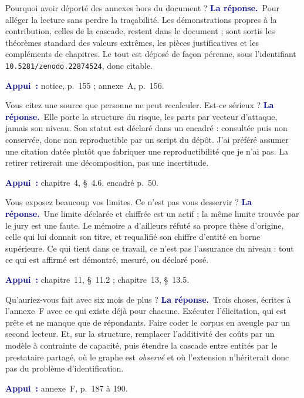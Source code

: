 \documentclass[11pt,a4paper]{article}
\newcommand{\rep}[1]{\smallskip\noindent\textcolor{navy}{\textbf{La réponse.}}\ #1\par}
\newcommand{\appui}[1]{\smallskip\noindent\small\textcolor{navy}{\textbf{Appui~:}} #1\par\normalsize}
\begin{document}
\begin{question}{\og Pourquoi avoir déporté des annexes hors du document ?\fg{}}
\rep{Pour alléger la lecture sans perdre la traçabilité. Les démonstrations propres à la
contribution, celles de la cascade, restent dans le document ; sont sortis les théorèmes standard
des valeurs extrêmes, les pièces justificatives et les compléments de chapitres. Le tout est déposé
de façon pérenne, sous l'identifiant \texttt{10.5281/zenodo.22874524}, donc citable.}
\appui{notice, p.~155 ; annexe~A, p.~156.}
\end{question}

\begin{question}{\og Vous citez une source que personne ne peut recalculer. Est-ce sérieux ?\fg{}}
\rep{Elle porte la structure du risque, les parts par vecteur d'attaque, jamais son niveau. Son
statut est déclaré dans un encadré : consultée puis non conservée, donc non reproductible par un
script du dépôt. J'ai préféré assumer une citation datée plutôt que fabriquer une reproductibilité
que je n'ai pas. La retirer retirerait une décomposition, pas une incertitude.}
\appui{chapitre~4, \S~4.6, encadré p.~50.}
\end{question}

\begin{question}{\og Vous exposez beaucoup vos limites. Ce n'est pas vous desservir ?\fg{}}
\rep{Une limite déclarée et chiffrée est un actif ; la même limite trouvée par le jury est une
faute. Le mémoire a d'ailleurs réfuté sa propre thèse d'origine, celle qui lui donnait son titre, et
requalifié son chiffre d'entité en borne supérieure. Ce qui tient dans ce travail, ce n'est pas
l'assurance du niveau : tout ce qui est affirmé est démontré, mesuré, ou déclaré posé.}
\appui{chapitre~11, \S~11.2 ; chapitre~13, \S~13.5.}
\end{question}

\begin{question}{\og Qu'auriez-vous fait avec six mois de plus ?\fg{}}
\rep{Trois choses, écrites à l'annexe~F avec ce qui existe déjà pour chacune. Exécuter
l'élicitation, qui est prête et ne manque que de répondants. Faire coder le corpus en aveugle par un
second lecteur. Et, sur la structure, remplacer l'additivité des coûts par un modèle à contrainte de
capacité, puis étendre la cascade entre entités par le prestataire partagé, où le graphe est
\emph{observé} et où l'extension n'hériterait donc pas du problème d'identification.}
\appui{annexe~F, p.~187 à 190.}
\end{question}
\end{document}

